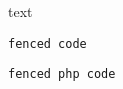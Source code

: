 text

\begin{lstlisting}
fenced code
\end{lstlisting}
\lstset{language=php}\begin{lstlisting}
fenced php code
\end{lstlisting}

